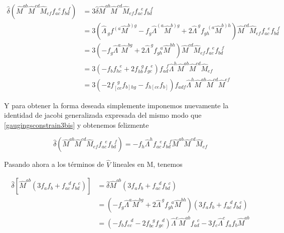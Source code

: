 \documentclass{article}
\numberwithin{equation}{section}
\begin{document}
\begin{equation}
\begin{aligned}
\hat{\delta} \left( \hat{M}^{a b} \hat{M}^{c d}\hat{M}_{e f} f_{a c}^{\ \ \ e} f_{b d}^{\ \ \ f} \right) &= 3 \hat{\delta} \hat{M}^{a b} \hat{M}^{c d}\hat{M}_{e f} f_{a c}^{\ \ \ e} f_{b d}^{\ \ \ f}\\
&= 3 \left(\hat{\Lambda}_{\ g} f^{\left( a \right.}\hat{M}^{\left. b\right) g} - f_g \hat{\Lambda}^{\left( a\right.} \hat{M}^{\left. b\right) g} + 2 \hat{\Lambda}^{\ g} f_{g h}^{\ \ \  \left(a\right.} \hat{M}^{\left. b\right) h} \right) \hat{M}^{c d}\hat{M}_{e f} f_{a c}^{\ \ \ e} f_{b d}^{\ \ \ f}\\
&=3 \left(- f_g \hat{\Lambda}^{a} \hat{M}^{b g} + 2 \hat{\Lambda}^{\ g} f_{g h}^{\ \ \  a} \hat{M}^{b h} \right) \hat{M}^{c d}\hat{M}_{e f} f_{a c}^{\ \ \ e} f_{b d}^{\ \ \ f} \\
&=3 \left(- f_b f_{h c}^{\ \ \ e} + 2 f_{h b}^{\ \ \  g} f_{g c}^{\ \ \  e} \right) f_{a d}^{\ \ \  f} \hat{\Lambda}^h \hat{M}^{a b} \hat{M}^{c d}\hat{M}_{e f}\\
&= 3 \left(-2 f_{\left[c e\right.}^{\ \ \  g} f_{\left. b\right] h g} - f_{h \left[c e\right.}f_{\left. b\right]} \right) f_{a d f}\hat{\Lambda}^h \hat{M}^{a b} \hat{M}^{c d}\hat{M}^{e f}
\end{aligned}
\end{equation} 

Y para obtener la forma deseada simplemente imponemos nuevamente la identidad de jacobi generalizada expresada del mismo modo que \ref{gaugingsconstrain3bis} y obtenemos felizmente

\begin{equation}
\hat{\delta} \left( \hat{M}^{a b} \hat{M}^{c d}\hat{M}_{e f} f_{a c}^{\ \ \ e} f_{b d}^{\ \ \ f} \right) = - f_h \hat{\Lambda}^h f_{a c}^{\ \ \ e} f_{b d}^{\ \ \ f} \hat{M}^{a b} \hat{M}^{c d}\hat{M}_{e f} 
\end{equation}

Pasando ahora a los términos de $ \hat{V} $ lineales en M, tenemos

\begin{equation}\label{hatVaux1}
\begin{aligned}
\hat{\delta}\left[\hat{M}^{a b} \left( 3 f_a f_b + f_{a c}^{\ \ \ d} f_{b d}^{\ \ \ c} \right)\right] &= \hat{\delta} \hat{M}^{a b} \left( 3 f_a f_b + f_{a c}^{\ \ \ d} f_{b d}^{\ \ \ c} \right)\\
&= \left(- f_g \hat{\Lambda}^{a} \hat{M}^{b g} + 2 \hat{\Lambda}^{\ g} f_{g h}^{\ \ \  a} \hat{M}^{b h} \right) \left( 3 f_a f_b + f_{a c}^{\ \ \ d} f_{b d}^{\ \ \ c} \right)\\
&= \left( -f_b f_{e c}^{\ \ \ d} - 2 f_{b e}^{\ \ \ g} f_{g c}^{\ \ \ d} \right) \hat{\Lambda}^e \hat{M}^{a b} f_{a d}^{\ \ \ c} - 3 f_c \hat{\Lambda}^c f_a f_b \hat{M}^{a b}
\end{aligned}
\end{equation}
\end{document}
